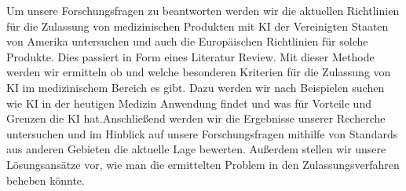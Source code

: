 Um unsere Forschungsfragen zu beantworten werden wir die aktuellen Richtlinien für die Zulassung von medizinischen Produkten mit KI der Vereinigten Staaten von Amerika untersuchen und auch die Europäischen Richtlinien für solche Produkte. Dies passiert in Form eines Literatur Review. Mit dieser Methode werden wir ermitteln ob und welche besonderen Kriterien für die Zulassung von KI im medizinischem Bereich es gibt. Dazu werden wir nach Beispielen suchen wie KI in der heutigen Medizin Anwendung findet und was für Vorteile und Grenzen die KI hat.\linebreak Anschließend werden wir die Ergebnisse unserer Recherche untersuchen und im Hinblick auf unsere Forschungsfragen mithilfe von Standards aus anderen Gebieten die aktuelle Lage bewerten.  Außerdem stellen wir unsere Lösungsansätze vor, wie man die ermittelten Problem in den Zulassungsverfahren beheben könnte.